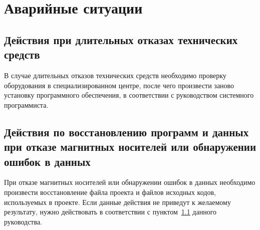 \documentclass[a4paper]{G2-105}
\begin{document}
\chapter{Аварийные ситуации}

\ttl

\section{Действия при длительных отказах технических средств}\label{sec:otkaz_sec}

В случае длительных отказов технических средств необходимо проверку оборудования в специализированном центре, после чего произвести заново установку программного обеспечения, в соответствии с руководством системного программиста.

\section{Действия по восстановлению программ и данных при отказе магнитных носителей или обнаружении ошибок в данных}

При отказе магнитных носителей или обнаружении ошибок в данных необходимо произвести восстановление файла проекта и файлов исходных кодов, используемых в проекте. Если данные действия не приведут к желаемому результату, нужно действовать в соответствии с пунктом~\ref{sec:otkaz_sec} данного руководства.
\end{document}
